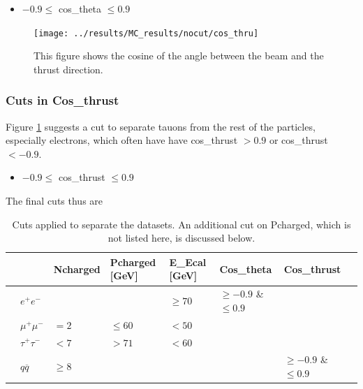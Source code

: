 \begin{itemize}
	\item{ $-0.9\le$ cos\_theta $\le0.9$}
\end{itemize}

\newpage
\begin{figure}[H]
\centering
\texttt{[image: ../results/MC\_results/nocut/cos\_thru]}
\caption[Cos\_thru in simulation data]{This figure shows the cosine of the angle between the beam and the thrust direction.}
\label{fig:cos_thru}
\end{figure}

\subsubsection{Cuts in Cos\_thrust}
Figure \ref{fig:cos_thru} suggests a cut to separate tauons from the rest of the particles, especially electrons, which often have have cos\_thrust $>0.9$ or cos\_thrust $<-0.9$.

\begin{itemize}
	\item{ $-0.9\le$ cos\_thrust $\le0.9$}
\end{itemize}

The final cuts thus are
\begin{table}[H]\centering
	\begin{tabular}{@{}llllllll@{}}
		\toprule
		&			&Ncharged	&Pcharged [GeV]	&E\_Ecal [GeV] &Cos\_theta				&Cos\_thrust\\ 
		\midrule
		&$e^+e^-$	&			&				&$\ge70$		&$\ge-0.9$ \& $\le0.9$	&\\
		&$\mu^+\mu^-$		&$=2$			&$\le60$		&$<50$			&						&\\
		&$\tau^+\tau^-$		&$<7$		&$>71$			&$<60$			&						&\\
		&$q\overline{q}$		&$\ge8$		&				&				&						&$\ge-0.9$ \& $\le0.9$	\\
		\bottomrule
	\end{tabular}
	\caption[Table of cuts]{Cuts applied to separate the datasets. An additional cut on Pcharged, which is not listed here, is discussed below.}
\end{table}
\newpage
